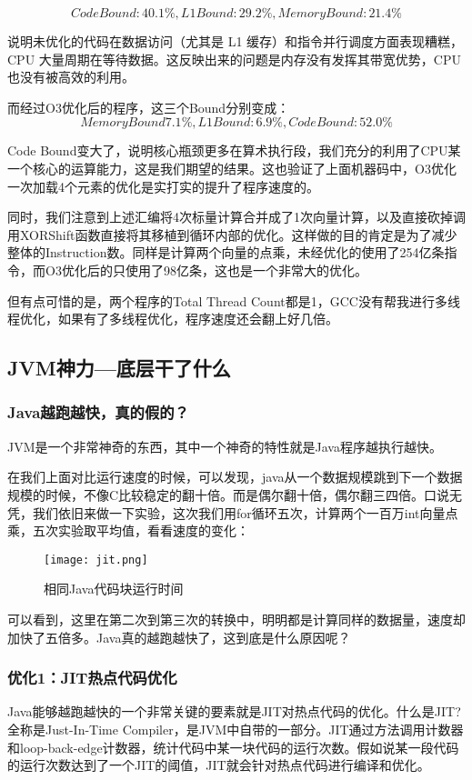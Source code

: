 \documentclass[11pt]{article}
\begin{document}
$$Code Bound: 40.1\%, L1 Bound: 29.2\%, Memory Bound: 21.4\%$$

说明未优化的代码在数据访问（尤其是 L1 缓存）和指令并行调度方面表现糟糕，CPU 大量周期在等待数据。这反映出来的问题是内存没有发挥其带宽优势，CPU也没有被高效的利用。


而经过O3优化后的程序，这三个Bound分别变成：
$$Memory Bound7.1\%,L1 Bound:6.9\%,Code Bound:52.0\%$$

Code Bound变大了，说明核心瓶颈更多在算术执行段，我们充分的利用了CPU某一个核心的运算能力，这是我们期望的结果。这也验证了上面机器码中，O3优化一次加载4个元素的优化是实打实的提升了程序速度的。


同时，我们注意到上述汇编将4次标量计算合并成了1次向量计算，以及直接砍掉调用XORShift函数直接将其移植到循环内部的优化。这样做的目的肯定是为了减少整体的Instruction数。同样是计算两个向量的点乘，未经优化的使用了254亿条指令，而O3优化后的只使用了98亿条，这也是一个非常大的优化。


但有点可惜的是，两个程序的Total Thread Count都是1，GCC没有帮我进行多线程优化，如果有了多线程优化，程序速度还会翻上好几倍。



\subsection{JVM神力—底层干了什么}
\subsubsection{Java越跑越快，真的假的？}
JVM是一个非常神奇的东西，其中一个神奇的特性就是Java程序越执行越快。


在我们上面对比运行速度的时候，可以发现，java从一个数据规模跳到下一个数据规模的时候，不像C比较稳定的翻十倍。而是偶尔翻十倍，偶尔翻三四倍。口说无凭，我们依旧来做一下实验，这次我们用for循环五次，计算两个一百万int向量点乘，五次实验取平均值，看看速度的变化：


\begin{figure}[H]
  \centering
  \texttt{[image: jit.png]}
  \caption{相同Java代码块运行时间}
  \label{fig:example}
\end{figure}


可以看到，这里在第二次到第三次的转换中，明明都是计算同样的数据量，速度却加快了五倍多。Java真的越跑越快了，这到底是什么原因呢？

\subsubsection{优化1：JIT热点代码优化}
Java能够越跑越快的一个非常关键的要素就是JIT对热点代码的优化。什么是JIT? 全称是Just-In-Time Compiler，是JVM中自带的一部分。JIT通过方法调用计数器和loop-back-edge计数器，统计代码中某一块代码的运行次数。假如说某一段代码的运行次数达到了一个JIT的阈值，JIT就会针对热点代码进行编译和优化。
\end{document}
